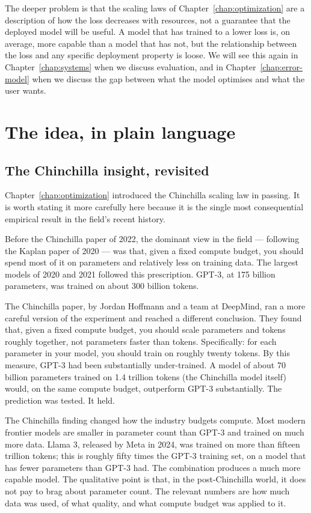 The deeper problem is that the scaling laws of Chapter~\ref{chap:optimization} are a
description of how the loss decreases with resources, not a
guarantee that the deployed model will be useful. A model that
has trained to a lower loss is, on average, more capable than a
model that has not, but the relationship between the loss and
any specific deployment property is loose. We will see this
again in Chapter~\ref{chap:systems} when we discuss evaluation, and in
Chapter~\ref{chap:error-model} when we discuss the gap between what the model
optimises and what the user wants.

\section{The idea, in plain language}

\subsection*{The Chinchilla insight, revisited}

Chapter~\ref{chap:optimization} introduced the Chinchilla scaling law in passing. It
is worth stating it more carefully here because it is the
single most consequential empirical result in the field's
recent history.

Before the Chinchilla paper of 2022, the dominant view in the
field --- following the Kaplan paper of 2020 --- was that, given
a fixed compute budget, you should spend most of it on
parameters and relatively less on training data. The largest
models of 2020 and 2021 followed this prescription. GPT-3, at
175 billion parameters, was trained on about 300 billion
tokens.

The Chinchilla paper, by Jordan Hoffmann and a team at
DeepMind, ran a more careful version of the experiment and
reached a different conclusion. They found that, given a fixed
compute budget, you should scale parameters and tokens roughly
together, not parameters faster than tokens. Specifically: for
each parameter in your model, you should train on roughly
twenty tokens. By this measure, GPT-3 had been substantially
under-trained. A model of about 70 billion parameters trained
on 1.4 trillion tokens (the Chinchilla model itself) would, on
the same compute budget, outperform GPT-3 substantially. The
prediction was tested. It held.

The Chinchilla finding changed how the industry budgets compute.
Most modern frontier models are smaller in parameter count than
GPT-3 and trained on much more data. Llama 3, released by Meta
in 2024, was trained on more than fifteen trillion tokens; this
is roughly fifty times the GPT-3 training set, on a model that
has fewer parameters than GPT-3 had. The combination produces a
much more capable model. The qualitative point is that, in the
post-Chinchilla world, it does not pay to brag about parameter
count. The relevant numbers are how much data was used, of what
quality, and what compute budget was applied to it.

